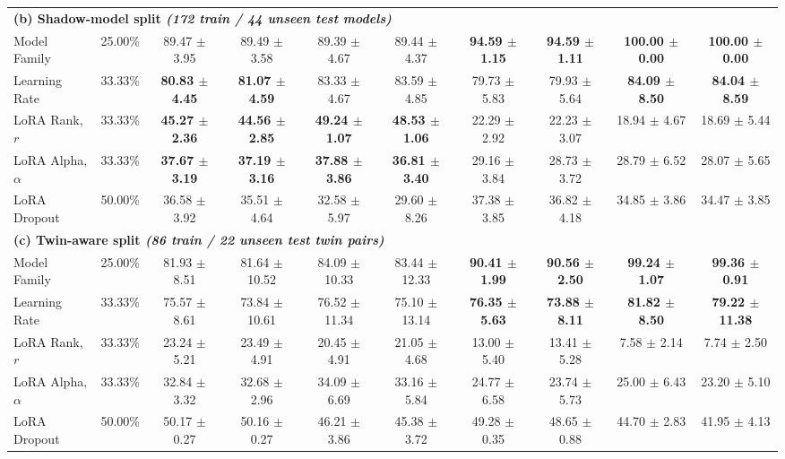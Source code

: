 \documentclass[11pt]{article}
\begin{document}
\begin{table}[t]
{\begin{tabular}{p{3.6cm} c cc cc cc cc}
    \midrule
    \multicolumn{10}{l}{\textbf{(b) Shadow-model split \textit{(172 train / 44 unseen test models)}}} \\
    \addlinespace[2pt]
    Model Family
    & 25.00\%
    & 89.47 $\pm$ 3.95 & 89.49 $\pm$ 3.58 & 89.39 $\pm$ 4.67 & 89.44 $\pm$ 4.37
    & \textbf{94.59 $\pm$ 1.15} & \textbf{94.59 $\pm$ 1.11} & \textbf{100.00 $\pm$ 0.00} & \textbf{100.00 $\pm$ 0.00} \\
    Learning Rate
    & 33.33\%
    & \textbf{80.83 $\pm$ 4.45} & \textbf{81.07 $\pm$ 4.59} & 83.33 $\pm$ 4.67 & 83.59 $\pm$ 4.85
    & 79.73 $\pm$ 5.83 & 79.93 $\pm$ 5.64 & \textbf{84.09 $\pm$ 8.50} & \textbf{84.04 $\pm$ 8.59} \\
    LoRA Rank, $r$
    & 33.33\%
    & \textbf{45.27 $\pm$ 2.36} & \textbf{44.56 $\pm$ 2.85} & \textbf{49.24 $\pm$ 1.07} & \textbf{48.53 $\pm$ 1.06}
    & 22.29 $\pm$ 2.92 & 22.23 $\pm$ 3.07 & 18.94 $\pm$ 4.67 & 18.69 $\pm$ 5.44 \\
    LoRA Alpha, $\alpha$
    & 33.33\%
    & \textbf{37.67 $\pm$ 3.19} & \textbf{37.19 $\pm$ 3.16} & \textbf{37.88 $\pm$ 3.86} & \textbf{36.81 $\pm$ 3.40}
    & 29.16 $\pm$ 3.84 & 28.73 $\pm$ 3.72 & 28.79 $\pm$ 6.52 & 28.07 $\pm$ 5.65 \\
    LoRA Dropout
    & 50.00\%
    & 36.58 $\pm$ 3.92 & 35.51 $\pm$ 4.64 & 32.58 $\pm$ 5.97 & 29.60 $\pm$ 8.26
    & 37.38 $\pm$ 3.85 & 36.82 $\pm$ 4.18 & 34.85 $\pm$ 3.86 & 34.47 $\pm$ 3.85 \\

    \midrule
    \multicolumn{10}{l}{\textbf{(c) Twin-aware split \textit{(86 train / 22 unseen test twin pairs)}}} \\
    \addlinespace[2pt]
    Model Family
    & 25.00\%
    & 81.93 $\pm$ 8.51 & 81.64 $\pm$ 10.52 & 84.09 $\pm$ 10.33 & 83.44 $\pm$ 12.33
    & \textbf{90.41 $\pm$ 1.99} & \textbf{90.56 $\pm$ 2.50} & \textbf{99.24 $\pm$ 1.07} & \textbf{99.36 $\pm$ 0.91} \\
    Learning Rate
    & 33.33\%
    & 75.57 $\pm$ 8.61 & 73.84 $\pm$ 10.61 & 76.52 $\pm$ 11.34 & 75.10 $\pm$ 13.14
    & \textbf{76.35 $\pm$ 5.63} & \textbf{73.88 $\pm$ 8.11} & \textbf{81.82 $\pm$ 8.50} & \textbf{79.22 $\pm$ 11.38} \\
    LoRA Rank, $r$
    & 33.33\%
    & 23.24 $\pm$ 5.21 & 23.49 $\pm$ 4.91 & 20.45 $\pm$ 4.91 & 21.05 $\pm$ 4.68
    & 13.00 $\pm$ 5.40 & 13.41 $\pm$ 5.28 & 7.58 $\pm$ 2.14 & 7.74 $\pm$ 2.50 \\
    LoRA Alpha, $\alpha$
    & 33.33\%
    & 32.84 $\pm$ 3.32 & 32.68 $\pm$ 2.96 & 34.09 $\pm$ 6.69 & 33.16 $\pm$ 5.84
    & 24.77 $\pm$ 6.58 & 23.74 $\pm$ 5.73 & 25.00 $\pm$ 6.43 & 23.20 $\pm$ 5.10 \\
    LoRA Dropout
    & 50.00\%
    & 50.17 $\pm$ 0.27 & 50.16 $\pm$ 0.27 & 46.21 $\pm$ 3.86 & 45.38 $\pm$ 3.72
    & 49.28 $\pm$ 0.35 & 48.65 $\pm$ 0.88 & 44.70 $\pm$ 2.83 & 41.95 $\pm$ 4.13 \\

    \bottomrule
    \end{tabular}%
    }
\end{table}
\end{document}
